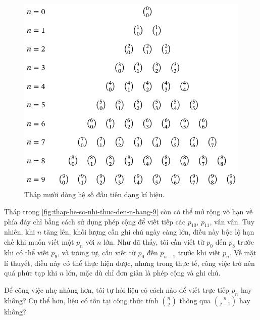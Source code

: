 \documentclass[12pt]{article} %
\begin{document}
\begin{figure}[htbp]
    \centering
    \includegraphics[scale=1]{./tex-images/thap-he-so-nhi-thuc-dang-ki-hieu-den-n-bang-9/thap-he-so-nhi-thuc-dang-ki-hieu-den-n-bang-9.pdf}
    \caption{Tháp mười dòng hệ số đầu tiên dạng kí hiệu.}
    \label{fig:thap-he-so-nhi-thuc-dang-ki-hieu-den-n-bang-9}
\end{figure}
Tháp trong \autoref{fig:thap-he-so-nhi-thuc-den-n-bang-9} còn có thể mở rộng vô hạn về phía đáy chỉ bằng cách sử dụng phép cộng để viết tiếp các \(p_{10}\), \(p_{11}\), vân vân. Tuy nhiên, khi \(n\) tăng lên, khối lượng cần ghi chú ngày càng lớn, điều này bộc lộ hạn chế khi muốn viết một \(p_n\) với \(n\) lớn. Như đã thấy, tôi cần viết từ \(p_0\) đến \(p_8\) trước khi có thể viết \(p_9\), và tương tự, cần viết từ \(p_0\) đến \(p_{n-1}\) trước khi viết \(p_n\). Về mặt lí thuyết, điều này có thể thực hiện được, nhưng trong thực tế, công việc trở nên quá phức tạp khi \(n\) lớn, mặc dù chỉ đơn giản là phép cộng và ghi chú. 

Để công việc nhẹ nhàng hơn, tôi tự hỏi liệu có cách nào để viết trực tiếp \(p_n\) hay không? Cụ thể hơn, liệu có tồn tại công thức tính \(\binom{n}{j}\) thông qua \(\binom{n}{j-1}\) hay không?
\end{document}
